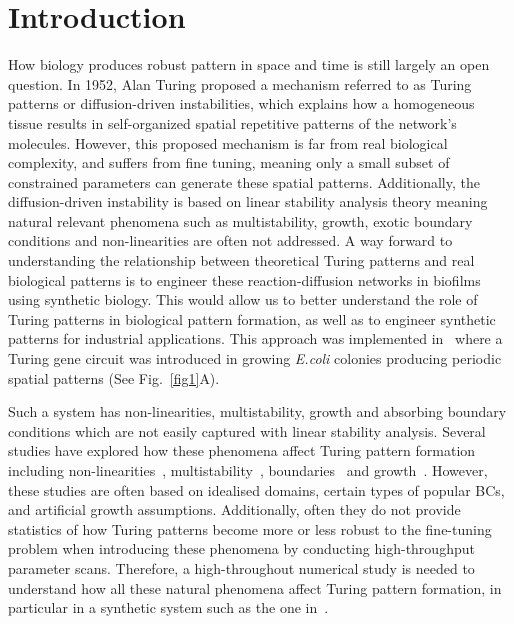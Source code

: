 \section{Introduction}

How biology produces robust pattern in space and time is still largely an open question.
In 1952, Alan Turing proposed a mechanism referred to as Turing patterns or diffusion-driven instabilities, which explains how a homogeneous tissue results in self-organized spatial repetitive patterns of the network’s molecules.
However, this proposed mechanism is far from real biological complexity, and suffers from fine tuning, meaning only a small subset of constrained parameters can generate these spatial patterns.
Additionally, the diffusion-driven instability is based on linear stability analysis theory meaning natural relevant phenomena such as multistability, growth, exotic boundary conditions and non-linearities are often not addressed.
A way forward to understanding the relationship between theoretical Turing patterns and real biological patterns is to engineer these reaction-diffusion networks in biofilms using synthetic biology.
This would allow us to better understand the role of Turing patterns in biological pattern formation, as well as to engineer synthetic patterns for industrial applications.
This approach was implemented in~\cite{Oliver2023} where a Turing gene circuit was introduced in growing \textit{E.coli} colonies producing periodic spatial patterns (See Fig.~\ref{fig1}A).

Such a system has non-linearities, multistability, growth and absorbing boundary conditions which are not easily captured with linear stability analysis.
Several studies have explored how these phenomena affect Turing pattern formation including non-linearities~\parencite{ermentrout1991stripes}, multistability~\parencite{Krause2023}, boundaries~\parencite{Arcuri1986,Maini1993, Maini1997,Krause2020, Krause2021, Woolley2022} and growth~\parencite{gaffney2010, Klika2017, Krause2019}.
However, these studies are often based on idealised domains, certain types of popular BCs, and artificial growth assumptions.
Additionally, often they do not provide statistics of how Turing patterns become more or less robust to the fine-tuning problem when introducing these phenomena by conducting high-throughput parameter scans.
Therefore, a high-throughout numerical study is needed to understand how all these natural phenomena affect Turing pattern formation, in particular in a synthetic system such as the one in~\cite{Oliver2023}.

